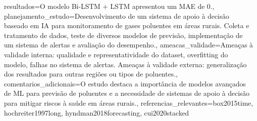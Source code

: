 \documentclass[12pt,a4paper]{article}
\begin{document}
{                        resultados={O modelo Bi-LSTM + LSTM apresentou um MAE de 0.},
                        planejamento_estudo={Desenvolvimento de um sistema de apoio à decisão baseado em IA para monitoramento de gases poluentes em áreas rurais. Coleta e tratamento de dados, teste de diversos modelos de previsão, implementação de um sistema de alertas e avaliação do desempenho.},
                        ameacas_validade={Ameaças à validade interna: qualidade e representatividade do dataset, overfitting do modelo, falhas no sistema de alertas. Ameaças à validade externa: generalização dos resultados para outras regiões ou tipos de poluentes.},
                        comentarios_adicionais={O estudo destaca a importância de modelos avançados de ML para previsão de poluentes e a necessidade de sistemas de apoio à decisão para mitigar riscos à saúde em áreas rurais.},
                        referencias_relevantes={box2015time, hochreiter1997long, hyndman2018forecasting, cui2020stacked}
                        }
\end{document}
